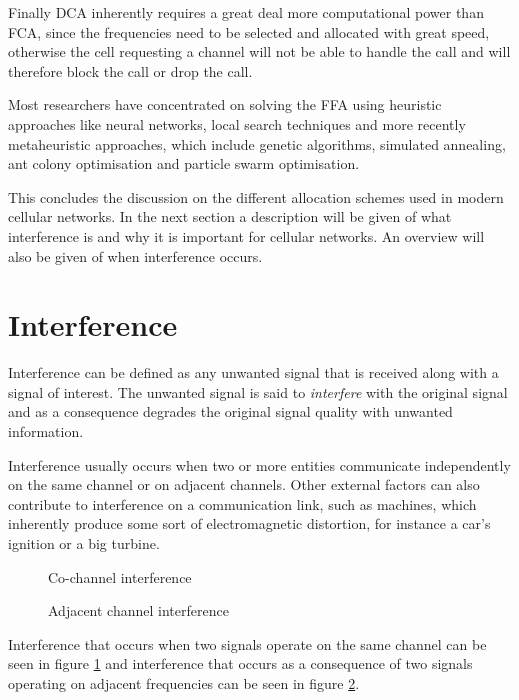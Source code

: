 Finally DCA inherently requires a great deal more computational power than FCA, since the frequencies need to be selected and allocated with great speed, otherwise the cell requesting a channel will not be able to handle the call and will therefore block the call or drop the call\cite{PrinciplesMobileCommunication,WirelessCommunications,MobileWirelessCommunications}.

Most researchers have concentrated on solving the FFA using heuristic approaches like neural networks, local search techniques and more recently metaheuristic approaches, which include genetic algorithms, simulated annealing, ant colony optimisation and particle swarm optimisation.

This concludes the discussion on the different allocation schemes used in modern cellular networks. In the next section a description will be given of what interference is and why it is important for cellular networks. An overview will also be given of when interference occurs.

\section{Interference}
\label{sec:Interference}
Interference can be defined as any unwanted signal that is received along with a signal of interest. The unwanted signal is said to \emph{interfere} with the original signal and as a consequence degrades the original signal quality with unwanted information\cite{WirelessDigitalCommunications}.

Interference usually occurs when two or more entities communicate independently on the same channel or on adjacent channels\cite{WirelessCommunications,WirelessDigitalCommunications}. Other external factors can also contribute to interference on a communication link, such as machines, which inherently produce some sort of electromagnetic distortion, for instance a car's ignition or a big turbine\cite{WirelessCommunications,WirelessDigitalCommunications}. 
\begin{figure}[t!]
	\begin{centering}
	
	\label{fig:sameinterference}
	\caption{Co-channel interference}
	\end{centering}
\end{figure}

\begin{figure}[bp!]
	\begin{centering}
	
	\label{fig:adjacentinterference}
	\caption{Adjacent channel interference}
	\end{centering}
\end{figure}
Interference that occurs when two signals operate on the same channel can be seen in figure \ref{fig:sameinterference} and interference that occurs as a consequence of two signals operating on adjacent frequencies can be seen in figure \ref{fig:adjacentinterference}.

